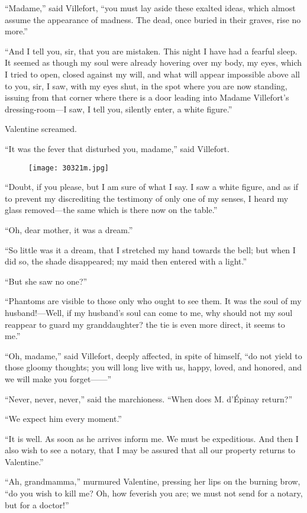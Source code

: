 “Madame,” said Villefort, “you must lay aside these exalted ideas,
which almost assume the appearance of madness. The dead, once buried in
their graves, rise no more.”

“And I tell you, sir, that you are mistaken. This night I have had a
fearful sleep. It seemed as though my soul were already hovering over
my body, my eyes, which I tried to open, closed against my will, and
what will appear impossible above all to you, sir, I saw, with my eyes
shut, in the spot where you are now standing, issuing from that corner
where there is a door leading into Madame Villefort’s dressing-room—I
saw, I tell you, silently enter, a white figure.”

Valentine screamed.

“It was the fever that disturbed you, madame,” said Villefort.

\begin{figure}[ht]
\texttt{[image: 30321m.jpg]}
\end{figure}

“Doubt, if you please, but I am sure of what I say. I saw a white
figure, and as if to prevent my discrediting the testimony of only one
of my senses, I heard my glass removed—the same which is there now on
the table.”

“Oh, dear mother, it was a dream.”

“So little was it a dream, that I stretched my hand towards the bell;
but when I did so, the shade disappeared; my maid then entered with a
light.”

“But she saw no one?”

“Phantoms are visible to those only who ought to see them. It was the
soul of my husband!—Well, if my husband’s soul can come to me, why
should not my soul reappear to guard my granddaughter? the tie is even
more direct, it seems to me.”

“Oh, madame,” said Villefort, deeply affected, in spite of himself, “do
not yield to those gloomy thoughts; you will long live with us, happy,
loved, and honored, and we will make you forget——”

“Never, never, never,” said the marchioness. “When does M. d’Épinay
return?”

“We expect him every moment.”

“It is well. As soon as he arrives inform me. We must be expeditious.
And then I also wish to see a notary, that I may be assured that all
our property returns to Valentine.”

“Ah, grandmamma,” murmured Valentine, pressing her lips on the burning
brow, “do you wish to kill me? Oh, how feverish you are; we must not
send for a notary, but for a doctor!”

